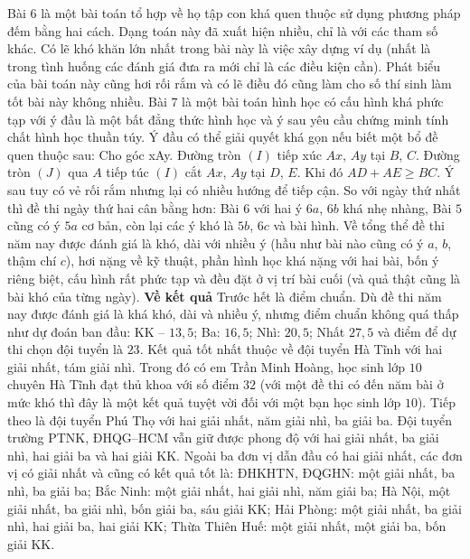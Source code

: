 \begin{multicols}{2}
	\vskip 0.1cm
	Bài $6$ là một bài toán tổ hợp về họ tập con khá quen thuộc sử dụng phương pháp đếm bằng hai cách. Dạng toán này đã xuất hiện nhiều, chỉ là với các tham số khác. Có lẽ khó khăn lớn nhất trong bài này là việc xây dựng ví dụ (nhất là trong tình huống các đánh giá đưa ra mới chỉ là các điều kiện cần). Phát biểu của bài toán này cũng hơi rối rắm và có lẽ điều đó cũng làm cho số thí sinh làm tốt bài này không nhiều.
	\vskip 0.1cm
	Bài $7$ là một bài toán hình học có cấu hình khá phức tạp với ý đầu là một bất đẳng thức hình học và ý sau yêu cầu chứng minh tính chất hình học thuần túy. Ý đầu có thể giải quyết khá gọn nếu biết một bổ đề quen thuộc sau: Cho góc xAy. Đường tròn $(I)$ tiếp xúc $Ax$, $Ay$ tại $B$, $C$. Đường tròn $(J)$ qua $A$ tiếp túc $(I)$ cắt $Ax$, $Ay$ tại $D$, $E$. Khi đó $AD + AE \ge BC$. Ý sau tuy có vẻ rối rắm nhưng lại có nhiều hướng để tiếp cận.
	\vskip 0.1cm
	So với ngày thứ nhất thì đề thi ngày thứ hai cân bằng hơn: Bài $6$ với hai ý $6a$, $6b$ khá nhẹ nhàng, Bài $5$ cũng có ý $5a$ cơ bản, còn lại các ý khó là $5b$, $6c$ và bài hình. 
	\vskip 0.1cm
	Về tổng thể đề thi năm nay được đánh giá là khó, dài với nhiều ý (hầu như bài nào cũng có ý $a$, $b$, thậm chí $c$), hơi nặng về kỹ thuật, phần hình học khá nặng với hai bài, bốn ý riêng biệt, cấu hình rất phức tạp và đều đặt ở vị trí bài cuối (và quả thật cũng là bài khó của từng ngày).
	\vskip 0.1cm
	\textbf{\color{cackithi}Về kết quả}
	\vskip 0.1cm
	Trước hết là điểm chuẩn. Dù đề thi năm nay được đánh giá là khá khó, dài và nhiều ý, nhưng điểm chuẩn không quá thấp như dự đoán ban đầu: KK -- $13{,}5$; Ba: $16{,}5$; Nhì: $20{,}5$; Nhất $27{,}5$ và điểm để dự thi chọn đội tuyển là $23$. 
	\vskip 0.1cm
	Kết quả tốt nhất thuộc về đội tuyển Hà Tĩnh với hai giải nhất, tám giải nhì. Trong đó có em Trần Minh Hoàng, học sinh lớp $10$ chuyên Hà Tĩnh đạt thủ khoa với số điểm $32$ (với một đề thi có đến năm bài ở mức khó thì đây là một kết quả tuyệt vời đối với một bạn học sinh lớp $10$).
	\vskip 0.1cm
	Tiếp theo là đội tuyển Phú Thọ với hai giải nhất, năm giải nhì, ba giải ba. Đội tuyển trường PTNK, ĐHQG--HCM vẫn giữ được phong độ với hai giải nhất, ba giải nhì, hai giải ba và hai giải KK. 
	\vskip 0.1cm
	Ngoài ba đơn vị dẫn đầu có hai giải nhất, các đơn vị có giải nhất và cũng có kết quả tốt là: ĐHKHTN, ĐQGHN: một giải nhất, ba nhì, ba giải ba; Bắc Ninh: một giải nhất, hai giải nhì, năm giải ba; Hà Nội, một giải nhất, ba giải nhì, bốn giải ba, sáu giải KK; Hải Phòng: một giải nhất, ba giải nhì, hai giải ba, hai giải KK; Thừa Thiên Huế: một giải nhất, một giải ba, bốn giải KK.
	\vskip 0.1cm

\end{multicols}
